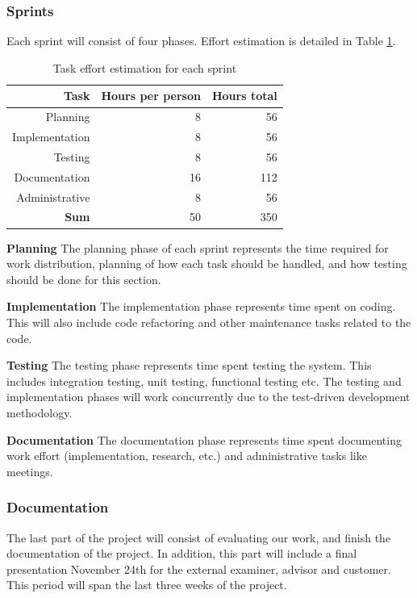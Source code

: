\subsubsection{Sprints}

Each sprint will consist of four phases. Effort estimation is
detailed in Table \ref{Sprint effort estimation}.

\begin{table}[htbp]
\begin{center}
  \begin{tabular}{|r|r|r|}
    \hline
    \bf{Task} & \bf{Hours per person} & \bf{Hours total} \\
    \hline
    Planning & 8 & 56 \\
    Implementation & 8 & 56 \\
    Testing & 8 & 56 \\
    Documentation & 16 & 112 \\
    Administrative & 8 & 56 \\
    \hline \hline
    \bf{Sum} & 50 & 350 \\
    \hline
  \end{tabular}
  \caption{Task effort estimation for each sprint}
  \label{Sprint effort estimation}
\end{center}
\end{table}

\textbf{Planning} The planning phase of each sprint represents the time
required for work distribution, planning of how each task should be handled,
and how testing should be done for this section.

\textbf{Implementation} The implementation phase represents time spent on coding.
This will also include code refactoring and other maintenance tasks
related to the code.

\textbf{Testing} The testing phase represents time spent testing the system.
This includes integration testing, unit testing, functional testing etc.
The testing and implementation phases will work concurrently due to the
test-driven development methodology.

\textbf{Documentation} The documentation phase represents time spent
documenting work effort (implementation, research, etc.) and administrative
tasks like meetings.

\subsubsection{Documentation}
The last part of the project will consist of evaluating our work, and finish the documentation of the project. In addition, this part will include a final presentation November 24th for the external examiner, advisor and customer. This period will span the last three weeks of the project.  
